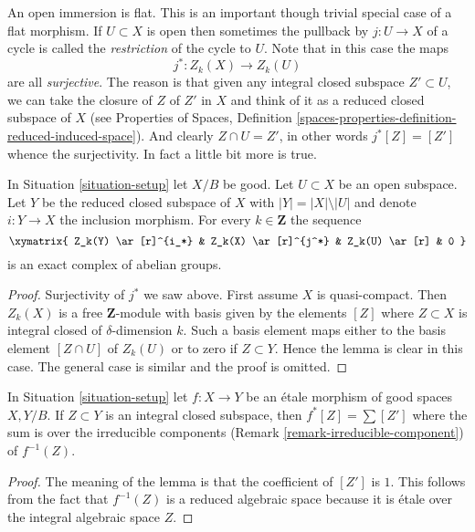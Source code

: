 \noindent
An open immersion is flat. This is an important though trivial special
case of a flat morphism. If $U \subset X$ is open then sometimes the
pullback by $j : U \to X$ of a cycle is called the {\it restriction} of the
cycle to $U$. Note that in this case the maps
$$
j^* : Z_k(X) \longrightarrow Z_k(U)
$$
are all {\it surjective}. The reason is that given any integral closed
subspace $Z' \subset U$, we can take the closure of $Z$ of $Z'$ in $X$
and think of it as a reduced closed subspace of $X$ (see
Properties of Spaces, Definition
\ref{spaces-properties-definition-reduced-induced-space}).
And clearly $Z \cap U = Z'$, in other words
$j^*[Z] = [Z']$ whence the surjectivity. In fact a little bit more
is true.

\begin{lemma}
\label{lemma-exact-sequence-open}
In Situation \ref{situation-setup} let $X/B$ be good.
Let $U \subset X$ be an open subspace. Let $Y$ be the
reduced closed subspace of $X$ with $|Y| = |X| \setminus |U|$
and denote $i : Y \to X$ the inclusion morphism.
For every $k \in \mathbf{Z}$ the sequence
$$
\xymatrix{
Z_k(Y) \ar[r]^{i_*} & Z_k(X) \ar[r]^{j^*} & Z_k(U) \ar[r] & 0
}
$$
is an exact complex of abelian groups.
\end{lemma}

\begin{proof}
Surjectivity of $j^*$ we saw above.
First assume $X$ is quasi-compact. Then $Z_k(X)$ is a free $\mathbf{Z}$-module
with basis given by the elements $[Z]$ where $Z \subset X$ is integral
closed of $\delta$-dimension $k$. Such a basis element maps
either to the basis element $[Z \cap U]$ of $Z_k(U)$
or to zero if $Z \subset Y$.
Hence the lemma is clear in this case. The general case is similar
and the proof is omitted.
\end{proof}

\begin{lemma}
\label{lemma-etale-pullback}
In Situation \ref{situation-setup} let $f : X \to Y$ be an \'etale
morphism of good spaces $X, Y/B$. If $Z \subset Y$ is an integral
closed subspace, then $f^*[Z] = \sum [Z']$ where the sum is over the
irreducible components (Remark \ref{remark-irreducible-component})
of $f^{-1}(Z)$.
\end{lemma}

\begin{proof}
The meaning of the lemma is that the coefficient of $[Z']$ is $1$.
This follows from the fact that $f^{-1}(Z)$ is a reduced algebraic space
because it is \'etale over the integral algebraic space $Z$.
\end{proof}

